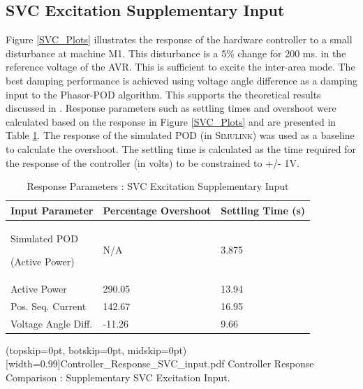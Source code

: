 \documentclass{ieeeaccess}
\begin{document}
\subsection{SVC Excitation Supplementary Input}
Figure \ref{SVC_Plots} illustrates the response of the hardware controller to a small disturbance at machine M1. This disturbance is a 5\% change for 200 ms. in the reference voltage of the AVR. This is sufficient to excite the inter-area mode. The best damping performance is achieved using voltage angle difference as a damping input to the Phasor-POD algorithm. This supports the theoretical results discussed in \cite{Yuwa}. Response parameters such as settling times and overshoot were calculated based on the response in Figure \ref{SVC_Plots} and are presented in Table \ref{SVCResponseTable}. The response of the simulated POD (in \textsc{Simulink}) was used as a baseline to calculate the overshoot. The settling time is calculated as the time required for the response of the controller (in volts) to be constrained to +/- 1V.

\begin{table}[htb]
\caption{Response Parameters : SVC Excitation Supplementary Input}\label{SVCResponseTable}

\begin{center}
\begin{tabular}{|p{80pt}|p{60pt}|p{60pt}|}

\hline \textbf{Input Parameter} & \textbf{Percentage Overshoot} & \textbf{Settling Time (s)} \\
\hline Simulated POD \par (Active Power)& N/A & 3.875 \\ 
\hline Active Power & 290.05 & 13.94 \\ 
\hline Pos. Seq. Current & 142.67 & 16.95\\ 
\hline Voltage Angle Diff. & -11.26 & 9.66\\ 
\hline 

\end{tabular}

\end{center}

\end{table}  

\Figure[tbp!](topskip=0pt, botskip=0pt, midskip=0pt)[width=0.99\columnwidth]{Controller_Response_SVC_input.pdf}
{Controller Response Comparison : Supplementary SVC Excitation Input.\label{SVC_Plots}}
\end{document}

